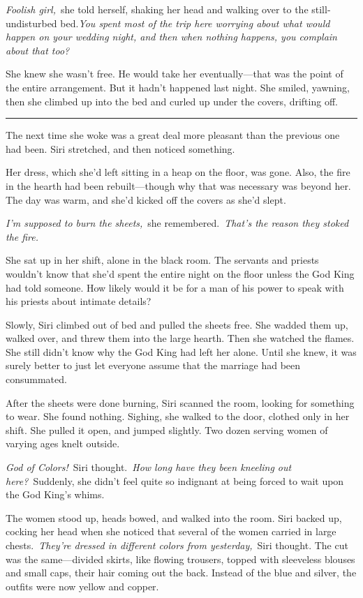 \textit{Foolish girl,}~she told herself, shaking her head and walking over to the still-undisturbed bed.\textit{You spent most of the trip here worrying about what would happen on your wedding night, and then when nothing happens, you complain about that too?}

She knew she wasn’t free. He would take her eventually—that was the point of the entire arrangement. But it hadn’t happened last night. She smiled, yawning, then she climbed up into the bed and curled up under the covers, drifting off.

\bigskip \hrule \bigskip

The next time she woke was a great deal more pleasant than the previous one had been. Siri stretched, and then noticed something.

Her dress, which she’d left sitting in a heap on the floor, was gone. Also, the fire in the hearth had been rebuilt—though why that was necessary was beyond her. The day was warm, and she’d kicked off the covers as she’d slept.

\textit{I’m supposed to burn the sheets,}~she remembered.~\textit{That’s the reason they stoked the fire.}

She sat up in her shift, alone in the black room. The servants and priests wouldn’t know that she’d spent the entire night on the floor unless the God King had told someone. How likely would it be for a man of his power to speak with his priests about intimate details?

Slowly, Siri climbed out of bed and pulled the sheets free. She wadded them up, walked over, and threw them into the large hearth. Then she watched the flames. She still didn’t know why the God King had left her alone. Until she knew, it was surely better to just let everyone assume that the marriage had been consummated.

After the sheets were done burning, Siri scanned the room, looking for something to wear. She found nothing. Sighing, she walked to the door, clothed only in her shift. She pulled it open, and jumped slightly. Two dozen serving women of varying ages knelt outside.

\textit{God of Colors!}~Siri thought.~\textit{How long have they been kneeling out here?}~Suddenly, she didn’t feel quite so indignant at being forced to wait upon the God King’s whims.

The women stood up, heads bowed, and walked into the room. Siri backed up, cocking her head when she noticed that several of the women carried in large chests.~\textit{They’re dressed in different colors from yesterday,}~Siri thought. The cut was the same—divided skirts, like flowing trousers, topped with sleeveless blouses and small caps, their hair coming out the back. Instead of the blue and silver, the outfits were now yellow and copper.

